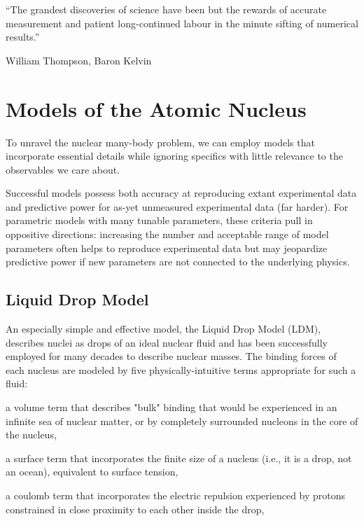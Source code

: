 
\epigraph{``The grandest discoveries of science have been but the rewards of
    accurate measurement and patient long-continued labour in the minute
sifting of numerical results.''}{William Thompson,  Baron Kelvin}

\section{Models of the Atomic Nucleus}

To unravel the nuclear many-body problem, we can
employ models that incorporate essential details while ignoring specifics with
little relevance to the observables we care about.

Successful models possess both accuracy at reproducing extant experimental data
and predictive power for as-yet unmeasured experimental data (far harder). For parametric models
with many tunable parameters, these criteria pull in oppositive directions: increasing the number
and acceptable range of model parameters often helps to reproduce experimental data but may
jeopardize predictive power if new parameters are not connected to the underlying physics.

\subsection{Liquid Drop Model}

An especially simple and
effective model, the Liquid Drop Model (LDM), describes nuclei as drops of
an ideal nuclear fluid and has been successfully employed for many decades to
describe nuclear masses. The binding forces of each nucleus are modeled by five
physically-intuitive terms appropriate for such a fluid:

a volume term that describes "bulk" binding that would be experienced in an
infinite sea of nuclear matter, or  by completely surrounded nucleons in the core of the nucleus,

a surface term that incorporates the finite size of a nucleus (i.e., it is a
drop, not an ocean), equivalent to surface tension,

a coulomb term that incorporates the electric repulsion experienced by protons
constrained in close proximity to each other inside the drop,

